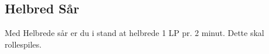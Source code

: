 \subsection{Helbred Sår}
Med Helbrede sår er du i stand at helbrede 1 LP pr. 2 minut. Dette skal rollespiles.